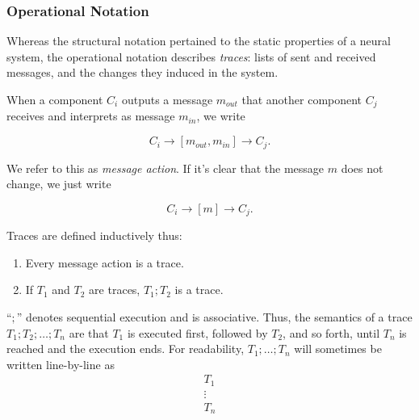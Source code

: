 \subsubsection{Operational Notation}

Whereas the structural notation pertained to the static properties of a neural system, the operational notation describes {\em traces}: lists of sent and received messages, and the changes they induced in the system.

\begin{definition}
	When a component $C_i$ outputs a message $m_{out}$ that another component $C_j$ receives and interprets as message $m_{in}$, we write
	
	$$
	C_i \rightarrow [m_{out}, m_{in}] \rightarrow C_j.
	$$
	
	We refer to this as {\em message action}. If it's clear that the message $m$ does not change, we just write
	
	$$
	C_i \rightarrow [m] \rightarrow C_j.
	$$
\end{definition}

\begin{definition}[Trace]
	Traces are defined inductively thus:
	\begin{enumerate}
		\item Every message action is a trace.
		\item If $T_1$ and $T_2$ are traces, $T_1;T_2$ is a trace.
	\end{enumerate}
	
	``$;$'' denotes sequential execution and is associative. Thus, the semantics of a trace $T_1;T_2;\dots;T_n$ are that $T_1$ is executed first, followed by $T_2$, and so forth, until $T_n$ is reached and the execution ends.
	For readability, $T_1;\dots;T_n$ will sometimes be written line-by-line as
	$$
	\begin{array}{l}
	T_1\\
	\vdots\\
	T_n
	\end{array}
	$$
\end{definition}

